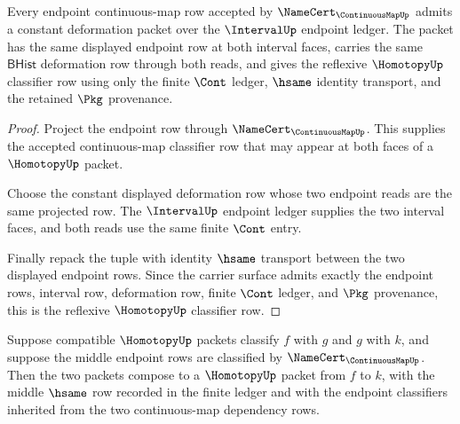 \begin{theorem}
\label{thm:homotopy-constant-deformation-reflexivity-row}
Every endpoint continuous-map row accepted by $\NameCert_{\ContinuousMapUp}$
admits a constant deformation packet over the $\IntervalUp$ endpoint ledger.
The packet has the same displayed endpoint row at both interval faces, carries
the same $\mathsf{BHist}$ deformation row through both reads, and gives the
reflexive $\HomotopyUp$ classifier row using only the finite $\Cont$ ledger,
$\hsame$ identity transport, and the retained $\Pkg$ provenance.
\end{theorem}

\begin{proof}
Project the endpoint row through $\NameCert_{\ContinuousMapUp}$. This supplies
the accepted continuous-map classifier row that may appear at both faces of a
$\HomotopyUp$ packet.

Choose the constant displayed deformation row whose two endpoint reads are the
same projected row. The $\IntervalUp$ endpoint ledger supplies the two interval
faces, and both reads use the same finite $\Cont$ entry.

Finally repack the tuple with identity $\hsame$ transport between the two
displayed endpoint rows. Since the carrier surface admits exactly the endpoint
rows, interval row, deformation row, finite $\Cont$ ledger, and $\Pkg$
provenance, this is the reflexive $\HomotopyUp$ classifier row.
\end{proof}

\begin{theorem}
\label{thm:homotopy-endpoint-composition-transitivity-row}
Suppose compatible $\HomotopyUp$ packets classify $f$ with $g$ and $g$ with
$k$, and suppose the middle endpoint rows are classified by
$\NameCert_{\ContinuousMapUp}$. Then the two packets compose to a
$\HomotopyUp$ packet from $f$ to $k$, with the middle $\hsame$ row recorded in
the finite ledger and with the endpoint classifiers inherited from the two
continuous-map dependency rows.
\end{theorem}


